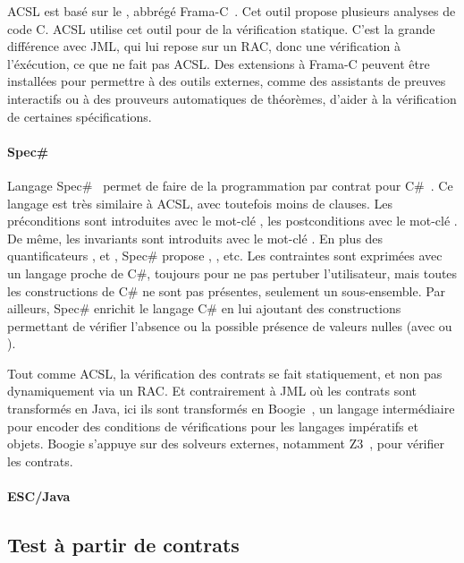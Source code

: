 ACSL est basé sur le , abbrégé
Frama-C~. Cet outil propose plusieurs analyses de code C. ACSL
utilise cet outil pour de la vérification statique. C'est la grande différence
avec JML, qui lui repose sur un RAC, donc une vérification à l'éxécution, ce que
ne fait pas ACSL. Des extensions à Frama-C peuvent être installées pour
permettre à des outils externes, comme des assistants de preuves interactifs ou
à des prouveurs automatiques de théorèmes, d'aider à la vérification de
certaines spécifications.

\paragraph{Spec\#} Langage Spec\#~ permet de faire de la
programmation par contrat pour C\#~. Ce langage est très similaire
à ACSL, avec toutefois moins de clauses. Les préconditions sont introduites avec
le mot-clé , les postconditions avec le mot-clé .
De même, les invariants sont introduits avec le mot-clé . En
plus des quantificateurs ,  et ,
Spec\# propose , ,  etc. Les contraintes sont
exprimées avec un langage proche de C\#, toujours pour ne pas pertuber
l'utilisateur, mais toutes les constructions de C\# ne sont pas présentes,
seulement un sous-ensemble.  Par ailleurs, Spec\# enrichit le langage C\# en lui
ajoutant des constructions permettant de vérifier l'absence ou la possible
présence de valeurs nulles (avec \code{!} ou ).

Tout comme ACSL, la vérification des contrats se fait statiquement, et non pas
dynamiquement via un RAC. Et contrairement à JML où les contrats sont
transformés en Java, ici ils sont transformés en Boogie~,
un langage intermédiaire pour encoder des conditions de vérifications pour les
langages impératifs et objets. Boogie s'appuye sur des solveurs externes,
notamment Z3~, pour vérifier les contrats.

\paragraph{ESC/Java} 

\subsection{Test à partir de contrats}
\label{subsection:sota:cbt}

